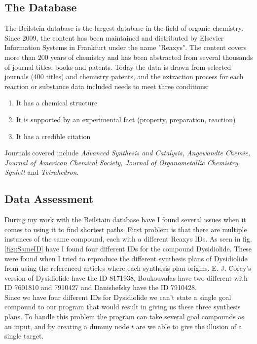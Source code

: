 \documentclass[a4paper,10pt,titlepage]{paper}
\begin{document}
\subsection{The Database}
The Beilstein database is the largest database in the field of organic chemistry. Since 2009, the content has been maintained and distributed by Elsevier Information Systems in Frankfurt under the name "Reaxys".
The content covers more than 200 years of chemistry and has been abstracted from several thousands of journal titles, books and patents. Today the data is drawn from selected journals (400 titles) and chemistry patents, and the extraction process for each reaction or substance data included needs to meet three conditions:
\begin{enumerate}
\item
It has a chemical structure
\item
It is supported by an experimental fact (property, preparation, reaction)
\item
It has a credible citation
\end{enumerate}
Journals covered include \textit{Advanced Synthesis and Catalysis, Angewandte Chemie, Journal of American Chemical Society, Journal of Organometallic Chemistry, Synlett} and \textit{Tetrahedron}. \cite{WikiReaxys}\cite{WikiBeilstein}
\subsection{Data Assessment}
During my work with the Beilstain database have I found several issues when it comes to using it to find shortest paths.
First problem is that there are multiple instances of the same compound, each with a different Reaxys IDs. As seen in fig.\ref{fig::SameID} have I found four different IDs for the compound Dysidiolide. These were found when I tried to reproduce the different synthesis plans of Dysidiolide from \cite{SynthesisPlans} using the referenced articles where each synthesis plan origins. E. J. Corey's version of Dysidiolide have the ID 8171938, Boukouvalas have two different with ID 7601810 and 7910427 and Danishefsky have the ID 7910428. \\
Since we have four different IDs for Dysidiolide we can't state a single goal compound to our program that would result in giving us these three synthesis plans. To handle this problem the program can take several goal compounds as an input, and by creating a dummy node $t$ are we able to give the illusion of a single target.
\end{document}
